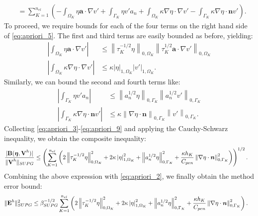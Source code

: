\documentclass[11pt]{article}
\newenvironment{proof}[1][Proof]{\begin{trivlist}
\item[\hskip \labelsep {\bfseries #1}]}{\end{trivlist}}
\begin{document}
\begin{proof}
\begin{align}
&= \sum_{K=1}^{n_{el}} \left( -\int_{\Omega_K} \eta \bm{a} \cdot \nabla v' + \int_{\Gamma_K} \eta v' a_n  + \int_{\Omega_K} \kappa \nabla \eta \cdot \nabla v' - \int_{\Gamma_K} \kappa \nabla \eta \cdot \bm{n} v' \right). \label{eq:apriori_5}
\end{align}
To proceed, we require bounds for each of the four terms on the right hand side of \eqref{eq:apriori_5}.  The first and third terms are easily bounded as before, yielding:
\begin{align}
\left| \int_{\Omega_K} \eta \bm{a} \cdot \nabla v' \right| & \leq \left\| \tau_K^{-1/2} \eta \right\|_{0,\Omega_K} \left\| \tau_K^{1/2} \bm{a} \cdot \nabla v' \right\|_{0,\Omega_K} \label{eq:apriori_6} \\
\left| \int_{\Omega_K} \kappa \nabla \eta \cdot \nabla v' \right|  & \leq \kappa \left| \eta \right|_{1,\Omega_K} \left| v' \right|_{1,\Omega_K}. \label{eq:apriori_7}
\end{align}
Similarly, we can bound the second and fourth terms like:
\begin{align}
\left| \int_{\Gamma_K} \eta v' a_n \right| & \leq \left\| a_n^{1/2} \eta \right\|_{0,\Gamma_K} \left\| a_n^{1/2} v' \right\|_{0,\Gamma_K} \label{eq:apriori_8} \\
\left| \int_{\Gamma_K} \kappa \nabla \eta \cdot \bm{n} v' \right|  & \leq \kappa \left\| \nabla \eta \cdot \bm{n} \right\|_{0,\Gamma_K} \left\| v' \right\|_{0,\Gamma_K}. \label{eq:apriori_9}
\end{align}
Collecting \eqref{eq:apriori_3}-\eqref{eq:apriori_9} and applying the Cauchy-Schwarz inequality, we obtain the composite inequality:
\begin{align}
\frac{|\textup{\textbf{B}}(\boldsymbol{\eta},\textup{\textbf{V}}^h)|}{\| \textup{\textbf{V}}^h \|_{SUPG}} &\leq \left( \sum_{K=1}^{n_{el}} \left( 2 \left\| \tau_K^{-1/2} \eta \right\|^2_{0,\Omega_K} + 2 \kappa \left| \eta \right|^2_{1,\Omega_K} + \left\| a_n^{1/2} \eta \right\|^2_{0,\Gamma_K} + \frac{\kappa h_K}{C_{pen}} \left\| \nabla \eta \cdot \bm{n} \right\|^2_{0,\Gamma_K} \right) \right)^{1/2}. \nonumber
\end{align}
Combining the above expression with \eqref{eq:apriori_2}, we finally obtain the method error bound:
\begin{align}
\| \textup{\textbf{E}}^h \|^2_{SUPG} &\leq \beta^{-1/2}_{SUPG} \sum_{K=1}^{n_{el}} \left( 2 \left\| \tau_K^{-1/2} \eta \right\|^2_{0,\Omega_K} + 2 \kappa \left| \eta \right|^2_{1,\Omega_K} + \left\| a_n^{1/2} \eta \right\|^2_{0,\Gamma_K} + \frac{\kappa h_K}{C_{pen}} \left\| \nabla \eta \cdot \bm{n} \right\|^2_{0,\Gamma_K} \right). \label{eq:apriori_10}

\end{align}
\end{proof}
\end{document}
